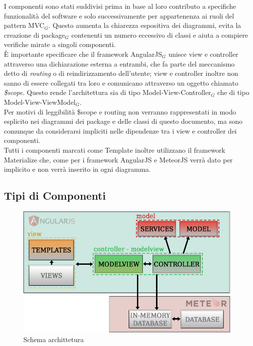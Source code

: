 I componenti sono stati suddivisi prima in base al loro contributo a specifiche funzionalità del software e solo successivamente per appartenenza ai ruoli del pattern MVC$_G$. Questo aumenta la chiarezza espositiva dei diagrammi, evita la creazione di package$_G$ contenenti un numero eccessivo di classi e aiuta a compiere verifiche mirate a singoli componenti. \\
È importante specificare che il framework AngularJS$_G$ unisce view e controller attraverso una dichiarazione esterna a entrambi, che fa parte del meccanismo detto di \textit{routing} o di reindirizzamento dell'utente; view e controller inoltre non sanno di essere collegati tra loro e comunicano attraverso un oggetto chiamato \textit{\$scope}. Questo rende l'architettura sia di tipo Model-View-Controller$_G$ che di tipo Model-View-ViewModel$_G$. \\
Per motivi di leggibilità \$scope e routing non verranno rappresentati in modo esplicito nei diagrammi dei package e delle classi di questo documento, ma sono comunque da considerarsi impliciti nelle dipendenze tra i view e controller dei componenti. \\
Tutti i componenti marcati come Template inoltre utilizzano il framework Materialize che, come per i framework AngularJS e MeteorJS verrà dato per implicito e non verrà inserito in ogni diagramma.

\subsection{Tipi di Componenti}

\begin{figure}[H]
\begin{center}
\includegraphics[scale=0.50]{img/architettura.jpg}
\caption{Schema archittetura}
\end{center}
\end{figure}


